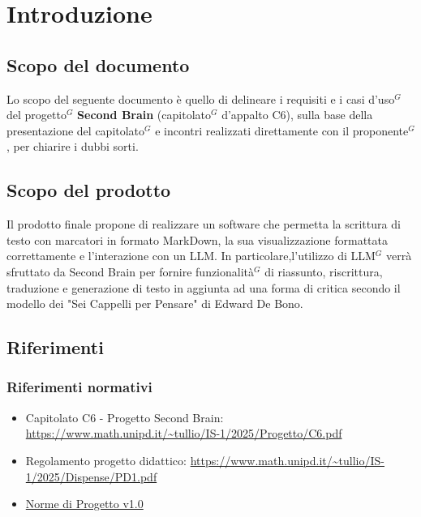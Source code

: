 \documentclass[a4paper,10pt]{article}
\def\\{ }%
\def\\{ }%
\def\\{ }%
\begin{document}
    \newpage

    \listoffigures

    \newpage

    \section{Introduzione}
    \subsection{Scopo del documento}
    Lo scopo del seguente documento è quello di delineare i requisiti e i casi d'uso$^G$ del
    progetto$^G$ \textbf{Second Brain} (capitolato$^G$ d'appalto C6), sulla base della presentazione
    del capitolato$^G$ e incontri realizzati direttamente con il proponente$^G$, per chiarire i dubbi sorti.
    \subsection{Scopo del prodotto}
    Il prodotto finale propone di realizzare un software che permetta la scrittura di testo con marcatori
    in formato MarkDown, la sua visualizzazione formattata correttamente e l'interazione con un LLM.
    In particolare,l'utilizzo di LLM$^G$ verrà sfruttato da Second Brain per fornire funzionalità$^G$
    di riassunto, riscrittura, traduzione e generazione di testo in aggiunta ad una forma di critica
    secondo il modello dei "Sei Cappelli per Pensare" di Edward De Bono.
    \subsection{Riferimenti}
    \subsubsection{Riferimenti normativi}
    \begin{itemize}
        \item Capitolato C6 - Progetto Second Brain: \\  \url{https://www.math.unipd.it/~tullio/IS-1/2025/Progetto/C6.pdf}
        \item Regolamento progetto didattico: \\ \url{https://www.math.unipd.it/~tullio/IS-1/2025/Dispense/PD1.pdf}
        \item \href{https://tool-8.github.io/Documentazione-SWE/}{Norme di Progetto v1.0}
    \end{itemize}
\end{document}
